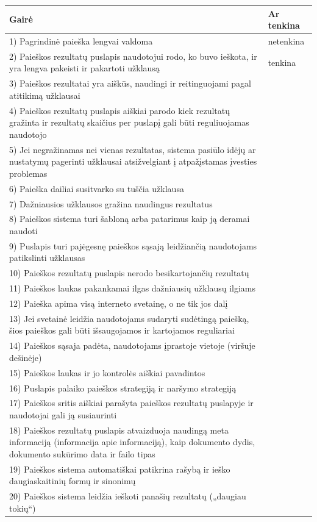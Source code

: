 \documentclass{VUMIFPSkursinis}
\begin{document}
\begin{center}
\begin{tabular}{ |p{}|p{2cm}| } 
 \hline
	Gairė & Ar tenkina \\ \hline
	1) Pagrindinė paieška lengvai valdoma & netenkina \\ \hline
	2) Paieškos rezultatų puslapis naudotojui rodo, ko buvo ieškota, ir yra lengva pakeisti ir pakartoti užklausą & tenkina \\ \hline
	3) Paieškos rezultatai yra aiškūs, naudingi ir reitinguojami pagal atitikimą užklausai &  \\ \hline
	4) Paieškos rezultatų puslapis aiškiai parodo kiek rezultatų gražinta ir rezultatų skaičius per puslapį gali būti reguliuojamas naudotojo &  \\ \hline
	5) Jei negražinamas nei vienas rezultatas, sistema pasiūlo idėjų ar nustatymų pagerinti užklausai atsižvelgiant į atpažįstamas įvesties problemas &  \\ \hline
	6) Paieška dailiai susitvarko su tuščia užklausa &  \\ \hline
	7) Dažniausios užklausos gražina naudingus rezultatus &  \\ \hline
	8) Paieškos sistema turi šabloną arba patarimus kaip ją deramai naudoti &  \\ \hline
	9) Puslapis turi pajėgesnę  paieškos sąsają leidžiančią naudotojams patikslinti užklausas &  \\ \hline
	10) Paieškos rezultatų puslapis nerodo besikartojančių rezultatų &  \\ \hline
	11) Paieškos laukas pakankamai ilgas dažniausių užklausų ilgiams &  \\ \hline
	12) Paieška apima visą interneto svetainę, o ne tik jos dalį &  \\ \hline
	13) Jei svetainė leidžia naudotojams sudaryti sudėtingą paiešką, šios paieškos gali būti išsaugojamos ir kartojamos reguliariai &  \\ \hline
	14) Paieškos sąsaja padėta, naudotojams įprastoje vietoje (viršuje dešinėje) &  \\ \hline
	15) Paieškos laukas ir jo kontrolės aiškiai pavadintos &  \\ \hline
	16) Puslapis palaiko paieškos strategiją ir naršymo strategiją &  \\ \hline
	17) Paieškos sritis aiškiai parašyta paieškos rezultatų puslapyje ir naudotojai gali ją susiaurinti &  \\ \hline
	18) Paieškos rezultatų puslapis atvaizduoja naudingą meta informaciją (informacija apie informaciją), kaip dokumento dydis, dokumento sukūrimo data ir failo tipas &  \\ \hline
	19) Paieškos sistema automatiškai patikrina rašybą ir ieško daugiaskaitinių formų ir sinonimų &  \\ \hline
	20) Paieškos sistema leidžia ieškoti panašių rezultatų („daugiau tokių“) &  \\ \hline
\end{tabular}
\label{paieškoslentelėpvz}
\end{center}
\end{document}
